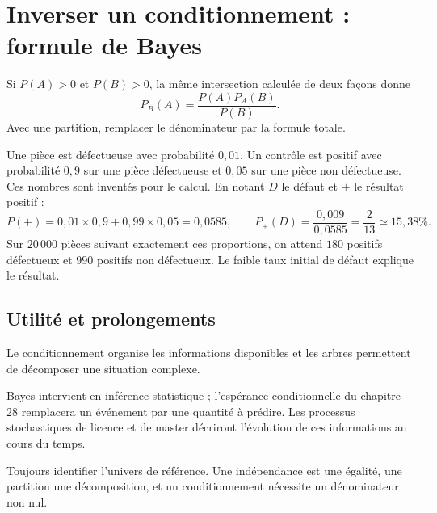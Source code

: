 \documentclass[../cours_1re.tex]{subfiles}
\begin{document}
\section{Inverser un conditionnement : formule de Bayes}
\approfondissement
Si $P(A)>0$ et $P(B)>0$, la même intersection calculée de deux façons donne
\[
P_B(A)=\frac{P(A)P_A(B)}{P(B)}.
\]
Avec une partition, remplacer le dénominateur par la formule totale.
\begin{exemple}
Une pièce est défectueuse avec probabilité $0{,}01$. Un contrôle est positif
avec probabilité $0{,}9$ sur une pièce défectueuse et $0{,}05$ sur une pièce
non défectueuse. Ces nombres sont inventés pour le calcul.
En notant $D$ le défaut et $+$ le résultat positif :
\[
P(+)=0{,}01\times0{,}9+0{,}99\times0{,}05=0{,}0585,
\qquad
P_+(D)=\frac{0{,}009}{0{,}0585}=\frac2{13}\simeq15{,}38\%.
\]
Sur $20\,000$ pièces suivant exactement ces proportions, on attend
$180$ positifs défectueux et $990$ positifs non défectueux.
Le faible taux initial de défaut explique le résultat.
\end{exemple}

\begin{finchapitre}
\section{Utilité et prolongements}
Le conditionnement organise les informations disponibles et les arbres
permettent de décomposer une situation complexe.

Bayes intervient en inférence statistique ; l'espérance conditionnelle du
chapitre 28 remplacera un événement par une quantité à prédire.
Les processus stochastiques de licence et de master décriront l'évolution
de ces informations au cours du temps.
\begin{retenir}
Toujours identifier l'univers de référence. Une indépendance est une
égalité, une partition une décomposition, et un conditionnement nécessite un dénominateur non nul.
\end{retenir}
\end{finchapitre}
\end{document}
